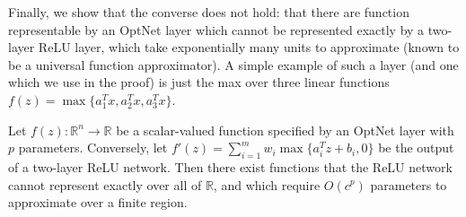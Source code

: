 Finally, we show that the converse does not hold: that there are function
representable by an OptNet layer which cannot be represented exactly by a
two-layer ReLU layer, which take exponentially many units to approximate
(known to be a universal function approximator).  A simple example
of such a layer (and one which we use in the proof) is just the max over three
linear functions  $f(z) = \max \{a_1^T x, a_2^Tx, a_3^T x\}$.

\begin{theorem}
  \label{theorem:rep}
  Let $f(z) : \mathbb{R}^{n} \rightarrow \mathbb{R}$ be a scalar-valued function
  specified by an OptNet layer with $p$ parameters.  Conversely, let
  $f'(z) = \sum_{i=1}^m w_i \max\{a_i^Tz + b_i, 0\}$ be the output of a
  two-layer ReLU network.
  Then there exist functions that the ReLU network cannot represent
  exactly over all of $\mathbb{R}$, and which require $O(c^p)$ parameters to
  approximate over a finite region.
\end{theorem}

